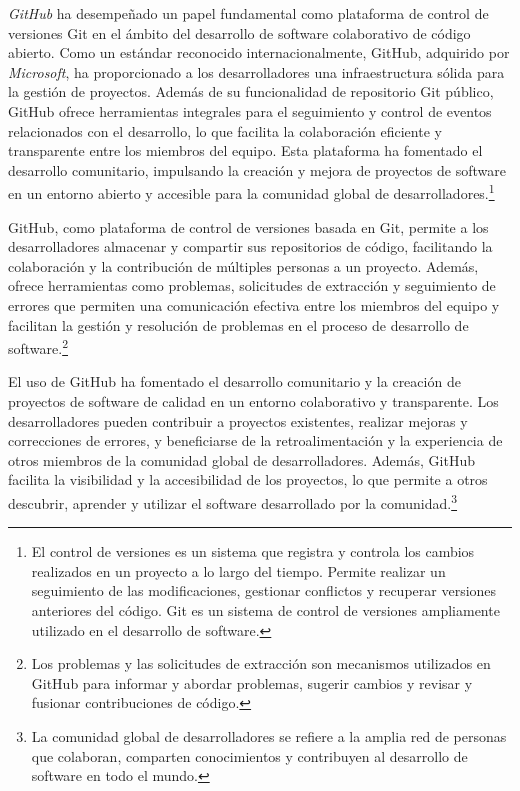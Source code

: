 \textit{GitHub} ha desempeñado un papel fundamental como plataforma de control de versiones Git en el ámbito del 
desarrollo de software colaborativo de código abierto. Como un estándar reconocido internacionalmente, 
GitHub, adquirido por \textit{Microsoft}, ha proporcionado a los desarrolladores una infraestructura sólida para
la gestión de proyectos. Además de su funcionalidad de repositorio Git público, GitHub ofrece 
herramientas integrales para el seguimiento y control de eventos relacionados con el desarrollo, 
lo que facilita la colaboración eficiente y transparente entre los miembros del equipo. 
Esta plataforma ha fomentado el desarrollo comunitario, impulsando la creación y mejora de proyectos 
de software en un entorno abierto y accesible para la comunidad global de 
desarrolladores.\footnote{El control de versiones es un sistema que registra y controla los cambios 
realizados en un proyecto a lo largo del tiempo. Permite realizar un seguimiento de las modificaciones, 
gestionar conflictos y recuperar versiones anteriores del código. Git es un sistema de control de 
versiones ampliamente utilizado en el desarrollo de software.}

GitHub, como plataforma de control de versiones basada en Git, permite a los desarrolladores 
almacenar y compartir sus repositorios de código, facilitando la colaboración y la contribución 
de múltiples personas a un proyecto. Además, ofrece herramientas como problemas, solicitudes de 
extracción y seguimiento de errores que permiten una comunicación efectiva entre los miembros del 
equipo y facilitan la gestión y resolución de problemas en el proceso de desarrollo de 
software.\footnote{Los problemas y las solicitudes de extracción son mecanismos utilizados en GitHub 
para informar y abordar problemas, sugerir cambios y revisar y fusionar contribuciones de código.}

El uso de GitHub ha fomentado el desarrollo comunitario y la creación de proyectos de software 
de calidad en un entorno colaborativo y transparente. Los desarrolladores pueden contribuir 
a proyectos existentes, realizar mejoras y correcciones de errores, y beneficiarse de la 
retroalimentación y la experiencia de otros miembros de la comunidad global de desarrolladores. 
Además, GitHub facilita la visibilidad y la accesibilidad de los proyectos, lo que permite a otros 
descubrir, aprender y utilizar el software desarrollado por la comunidad.\footnote{La comunidad 
global de desarrolladores se refiere a la amplia red de personas que colaboran, comparten conocimientos 
y contribuyen al desarrollo de software en todo el mundo.}

